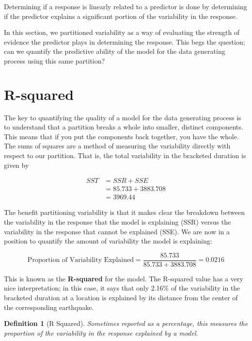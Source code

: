 \documentclass[
]{book}
\theoremstyle{plain}
\theoremstyle{mydefn}
\newtheorem{definition}{Definition}[chapter]
\theoremstyle{myexmpl}
\theoremstyle{remark}
\begin{document}
\begin{rmdkeyidea}
Determining if a response is linearly related to a predictor is done by determining if the predictor explains a significant portion of the variability in the response.
\end{rmdkeyidea}

In this section, we partitioned variability as a way of evaluating the strength of evidence the predictor plays in determining the response. This begs the question; can we quantify the predictive ability of the model for the data generating process using this same partition?

\hypertarget{r-squared}{%
\section{R-squared}\label{r-squared}}

The key to quantifying the quality of a model for the data generating process is to understand that a partition breaks a whole into smaller, distinct components. This means that if you put the components back together, you have the whole. The sums of squares are a method of measuring the variability directly with respect to our partition. That is, the total variability in the bracketed duration is given by

\[
\begin{aligned}
  SST &= SSR + SSE \\
    &= 85.733 + 3883.708 \\
    &= 3969.44
\end{aligned}
\]

The benefit partitioning variability is that it makes clear the breakdown between the variability in the response that the model is explaining (SSR) versus the variability in the response that cannot be explained (SSE). We are now in a position to quantify the amount of variability the model is explaining:

\[\text{Proportion of Variability Explained} = \frac{85.733}{85.733 + 3883.708} = 0.0216\]

This is known as the \textbf{R-squared} for the model. The R-squared value has a very nice interpretation; in this case, it says that only 2.16\% of the variability in the bracketed duration at a location is explained by its distance from the center of the corresponding earthquake.

\begin{definition}[R Squared]
\protect\hypertarget{def:defn-r-squared}{}{\label{def:defn-r-squared} {} }Sometimes reported as a percentage, this measures the proportion of the variability in the response explained by a model.
\end{definition}
\end{document}
